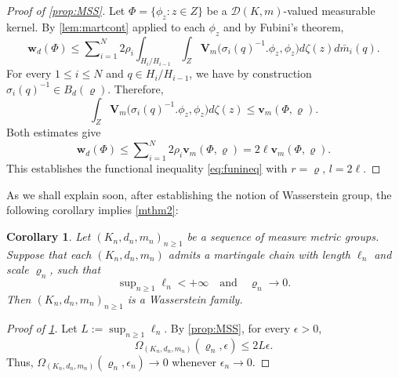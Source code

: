 \documentclass{amsart}
\numberwithin{equation}{subsection}
\theoremstyle{plain}
\newtheorem{cor}[cor]{Corollary}
\theoremstyle{definition}
\theoremstyle{plain}
\begin{document}
\begin{proof}[Proof of \cref{prop:MSS}]
Let \(\Phi=\{\phi_{z}:z\in Z\}\) be a \(\mathcal{D}\left(K,m\right)\)-valued measurable kernel. By \cref{lem:martcont} applied to each \(\phi_{z}\) and by Fubini's theorem,
\[\mathbf{w}_{d}\left(\Phi\right)\leq\sum\nolimits_{i=1}^{N}2\rho_{i}\int_{H_{i}/H_{i-1}}\int_{Z}\mathbf{V}_{m}\big(\sigma_{i}\left(q\right)^{-1}.\phi_{z},\phi_{z}\big)d\zeta\left(z\right)d\bar{m}_{i}\left(q\right).\]
For every \(1\leq i\leq N\) and \(q\in H_{i}/H_{i-1}\), we have by construction \(\sigma_{i}\left(q\right)^{-1}\in B_{d}\left(\varrho\right)\). Therefore,
\[\int_{Z}\mathbf{V}_{m}\big(\sigma_{i}\left(q\right)^{-1}.\phi_{z},\phi_{z}\big)d\zeta\left(z\right)\leq\mathbf{v}_{m}\left(\Phi,\varrho\right).\]
Both estimates give
\[\mathbf{w}_{d}\left(\Phi\right)\leq\sum\nolimits_{i=1}^{N}2\rho_{i}\mathbf{v}_{m}\left(\Phi,\varrho\right)=2\ell\mathbf{v}_{m}\left(\Phi,\varrho\right).\]
This establishes the functional inequality \eqref{eq:funineq} with \(r=\varrho,\,l=2\ell\).
\end{proof}

As we shall explain soon, after establishing the notion of Wasserstein group, the following corollary implies \cref{mthm2}:

\begin{cor}\label{cor:qutifilt}
Let \(\left(K_{n},d_{n},m_{n}\right)_{n\geq1}\) be a sequence of measure metric groups. Suppose that each \(\left(K_{n},d_{n},m_{n}\right)\) admits a martingale chain with length \(\ell_{n}\) and scale \(\varrho_{n}\), such that
\[\sup\nolimits_{n\geq1}\ell_{n}<+\infty\quad\text{and}\quad \varrho_{n}\to0.\]
Then \(\left(K_{n},d_{n},m_{n}\right)_{n\geq1}\) is a Wasserstein family.
\end{cor}

\begin{proof}[Proof of \cref{cor:qutifilt}]
Let \(L:=\sup_{n\geq1}\ell_{n}\). By \cref{prop:MSS}, for every \(\epsilon>0\),
\[\Omega_{\left(K_{n},d_{n},m_{n}\right)}\left(\varrho_{n},\epsilon\right)\leq2L\epsilon.\]
Thus, \(\Omega_{\left(K_{n},d_{n},m_{n}\right)}\left(\varrho_{n},\epsilon_{n}\right)\to0\) whenever \(\epsilon_{n}\to0\).
\end{proof}
\end{document}
